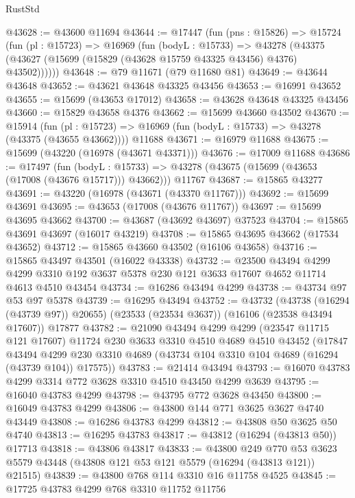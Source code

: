 \begin{lexlean}{RustStd}
\begin{coremodule}
@43628 := @43600 @11694
@43644 := @17447
    (fun (pns : @15826) =>
    @15724
      (fun (pl : @15723) =>
      @16969
        (fun (bodyL : @15733) =>
        @43278 (@43375 (@43627 (@15699 (@15829 (@43628 @15759 @43325 @43456) @4376) @43502))))))
@43648 := @79 @11671 (@79 @11680 @81)
@43649 := @43644 @43648
@43652 := @43621 @43648 @43325 @43456
@43653 := @16991 @43652
@43655 := @15699 (@43653 @17012)
@43658 := @43628 @43648 @43325 @43456
@43660 := @15829 @43658 @4376
@43662 := @15699 @43660 @43502
@43670 := @15914
    (fun (pl : @15723) => @16969 (fun (bodyL : @15733) => @43278 (@43375 (@43655 @43662))))
    @11688
@43671 := @16979 @11688
@43675 := @15699 (@43220 (@16978 (@43671 @43371)))
@43676 := @17009 @11688
@43686 := @17497
    (fun (bodyL : @15733) => @43278 (@43675 (@15699 (@43653 (@17008 (@43676 @15717))) @43662)))
    @11767
@43687 := @15865 @43277
@43691 := @43220 (@16978 (@43671 (@43370 @11767)))
@43692 := @15699 @43691
@43695 := @43653 (@17008 (@43676 @11767))
@43697 := @15699 @43695 @43662
@43700 := @43687 (@43692 @43697) @37523
@43704 := @15865 @43691 @43697 (@16017 @43219)
@43708 := @15865 @43695 @43662 (@17534 @43652)
@43712 := @15865 @43660 @43502 (@16106 @43658)
@43716 := @15865 @43497 @43501 (@16022 @43338)
@43732 := @23500
    @43494
    @4299
    @4299
    @3310
    @192
    @3637
    @5378
    @230
    @121
    @3633
    @17607
    @4652
    @11714
    @4613
    @4510
    @43454
@43734 := @16286 @43494 @4299
@43738 := @43734 @97 @53 @97 @5378
@43739 := @16295 @43494
@43752 := @43732
    (@43738 (@16294 (@43739 @97)) @20655)
    (@23533 (@23534 @3637))
    (@16106 (@23538 @43494 @17607))
    @17877
@43782 := @21090
    @43494
    @4299
    @4299
    (@23547 @11715 @121 @17607)
    @11724
    @230
    @3633
    @3310
    @4510
    @4689
    @4510
    @43452
    (@17847
      @43494
      @4299
      @230
      @3310
      @4689
      (@43734 @104 @3310 @104 @4689 (@16294 (@43739 @104)) @17575))
@43783 := @21414 @43494
@43793 := @16070 @43783 @4299 @3314 @772 @3628 @3310 @4510 @43450 @4299 @3639
@43795 := @16040 @43783 @4299
@43798 := @43795 @772 @3628 @43450
@43800 := @16049 @43783 @4299
@43806 := @43800 @144 @771 @3625 @3627 @4740 @43449
@43808 := @16286 @43783 @4299
@43812 := @43808 @50 @3625 @50 @4740
@43813 := @16295 @43783
@43817 := @43812 (@16294 (@43813 @50)) @17713
@43818 := @43806 @43817
@43833 := @43800
    @249
    @770
    @53
    @3623
    @5579
    @43448
    (@43808 @121 @53 @121 @5579 (@16294 (@43813 @121)) @21515)
@43839 := @43800 @768 @114 @3310 @16 @11758 @4525
@43845 := @17725 @43783 @4299 @768 @3310 @11752 @11756

\end{coremodule}
\end{lexlean}
